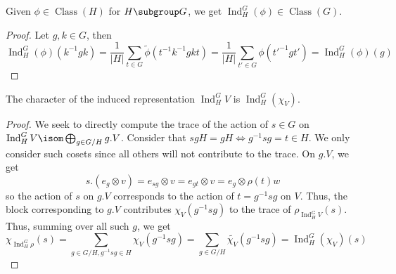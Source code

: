 \documentclass[11pt,leqno,oneside]{amsbook}
\newcommand{\Class}{\operatorname{Class}}
\newcommand{\Ind}{\operatorname{Ind}}
\numberwithin{thm}{section}
\begin{document}
\begin{prop}
  Given \(\phi \in \Class(H)\) for \(H \subgroup G\), we get
  \(\Ind_H^G(\phi) \in \Class(G)\).
\end{prop}
\begin{proof}
  Let \(g,k \in G\), then \[
    \Ind_H^G(\phi)(k^{-1}gk) = \frac{1}{|H|} \sum_{t \in G}
    \tilde{\phi}(t^{-1}k^{-1}gkt) = \frac{1}{|H|} \sum_{t' \in G}
    \phi(t'^{-1}gt') = \Ind_H^G(\phi)(g)
  \]
\end{proof}
\begin{thm}
  The character of the induced representation \(\Ind_H^G V\) is \(\Ind_H^G(\chi_V)\).
\end{thm}
\begin{proof}
  We seek to directly compute the trace of the action of \(s \in
  G\) on \(\Ind_H^G V \isom \bigoplus_{g \in G/H} g.V\). Consider that
  \(sgH = gH \iff g^{-1}sg = t \in H\). We only 
  consider such cosets since all others will not contribute to the
  trace.  On \(g.V\), we
  get \[
    s. (e_g \otimes v) = e_{sg}
    \otimes v = e_{gt} \otimes v = e_g \otimes \rho(t)w
  \]
  so the action of \(s\) on \(g.V\) corresponds to the action of \(t =
  g^{-1}sg\) on \(V\). Thus, the block corresponding to \(g.V\)
  contributes \(\chi_V(g^{-1}sg)\) to the trace of \(\rho_{\Ind_H^G
    V}(s)\). Thus, summing over all such \(g\), we get \[
    \chi_{\Ind_H^G \rho}(s) = \sum_{g \in G/H, g^{-1}sg \in H}
      \chi_V(g^{-1}sg) = \sum_{g \in G/H} \tilde{\chi_V}(g^{-1}sg) = \Ind_H^G(\chi_V)(s)
  \]
\end{proof}
\end{document}
